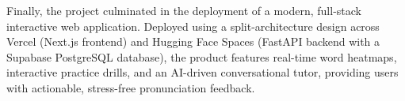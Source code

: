 Finally, the project culminated in the deployment of a modern, full-stack interactive web application. Deployed using a split-architecture design across Vercel (Next.js frontend) and Hugging Face Spaces (FastAPI backend with a Supabase PostgreSQL database), the product features real-time word heatmaps, interactive practice drills, and an AI-driven conversational tutor, providing users with actionable, stress-free pronunciation feedback.
